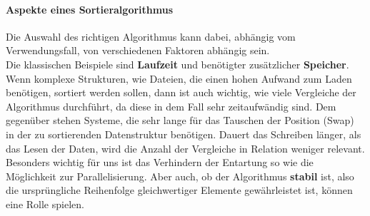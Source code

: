		\paragraph{Aspekte eines Sortieralgorithmus}
			Die Auswahl des richtigen Algorithmus kann dabei, abhängig vom Verwendungsfall, von verschiedenen Faktoren abhängig sein.\\
			Die klassischen Beispiele sind \textbf{Laufzeit} und benötigter zusätzlicher \textbf{Speicher}.
			Wenn komplexe Strukturen, wie Dateien, die einen hohen Aufwand zum Laden benötigen, sortiert werden sollen, dann ist auch wichtig, wie viele Vergleiche der Algorithmus durchführt, da diese in dem Fall sehr zeitaufwändig sind.
			Dem gegenüber stehen Systeme, die sehr lange für das Tauschen der Position (Swap) in der zu sortierenden Datenstruktur benötigen.
			Dauert das Schreiben länger, als das Lesen der Daten, wird die Anzahl der Vergleiche in Relation weniger relevant.\\
			Besonders wichtig für uns ist das Verhindern der Entartung so wie die Möglichkeit zur Parallelisierung.
			Aber auch, ob der Algorithmus \textbf{stabil} ist, also die ursprüngliche Reihenfolge gleichwertiger Elemente gewährleistet ist, können eine Rolle spielen.\\
			

